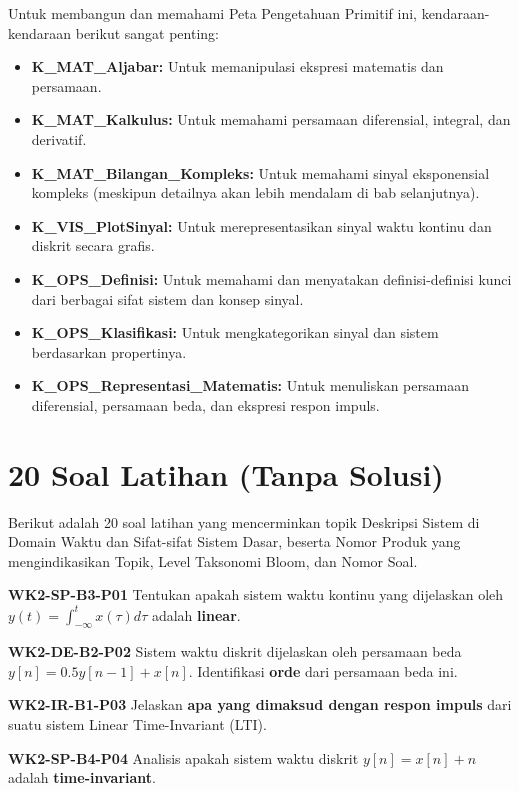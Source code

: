 \documentclass[
  letterpaper,
  DIV=11,
  numbers=noendperiod]{scrreprt}
\providecommand{\tightlist}{%
  \setlength{\itemsep}{0pt}\setlength{\parskip}{0pt}}
\begin{document}
Untuk membangun dan memahami Peta Pengetahuan Primitif ini,
kendaraan-kendaraan berikut sangat penting:

\begin{itemize}
\tightlist
\item
  \textbf{K\_MAT\_Aljabar:} Untuk memanipulasi ekspresi matematis dan
  persamaan.
\item
  \textbf{K\_MAT\_Kalkulus:} Untuk memahami persamaan diferensial,
  integral, dan derivatif.
\item
  \textbf{K\_MAT\_Bilangan\_Kompleks:} Untuk memahami sinyal
  eksponensial kompleks (meskipun detailnya akan lebih mendalam di bab
  selanjutnya).
\item
  \textbf{K\_VIS\_PlotSinyal:} Untuk merepresentasikan sinyal waktu
  kontinu dan diskrit secara grafis.
\item
  \textbf{K\_OPS\_Definisi:} Untuk memahami dan menyatakan
  definisi-definisi kunci dari berbagai sifat sistem dan konsep sinyal.
\item
  \textbf{K\_OPS\_Klasifikasi:} Untuk mengkategorikan sinyal dan sistem
  berdasarkan propertinya.
\item
  \textbf{K\_OPS\_Representasi\_Matematis:} Untuk menuliskan persamaan
  diferensial, persamaan beda, dan ekspresi respon impuls.
\end{itemize}


\chapter{20 Soal Latihan (Tanpa
Solusi)}\label{soal-latihan-tanpa-solusi}

Berikut adalah 20 soal latihan yang mencerminkan topik Deskripsi Sistem
di Domain Waktu dan Sifat-sifat Sistem Dasar, beserta Nomor Produk yang
mengindikasikan Topik, Level Taksonomi Bloom, dan Nomor Soal.

\textbf{WK2-SP-B3-P01} Tentukan apakah sistem waktu kontinu yang
dijelaskan oleh \(y(t) = \int_{-\infty}^{t} x(\tau) d\tau\) adalah
\textbf{linear}.

\textbf{WK2-DE-B2-P02} Sistem waktu diskrit dijelaskan oleh persamaan
beda \(y[n] = 0.5y[n-1] + x[n]\). Identifikasi \textbf{orde} dari
persamaan beda ini.

\textbf{WK2-IR-B1-P03} Jelaskan \textbf{apa yang dimaksud dengan respon
impuls} dari suatu sistem Linear Time-Invariant (LTI).

\textbf{WK2-SP-B4-P04} Analisis apakah sistem waktu diskrit
\(y[n] = x[n] + n\) adalah \textbf{time-invariant}.
\end{document}
